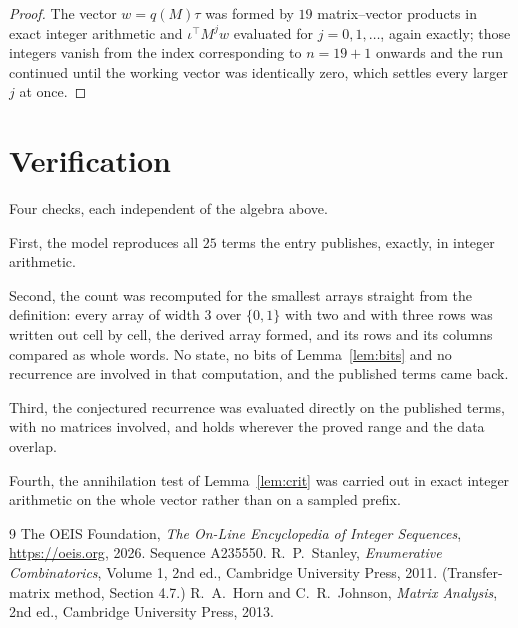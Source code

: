 \documentclass[11pt,a4paper]{article}
\theoremstyle{plain}
\theoremstyle{definition}
\begin{document}
\begin{proof}
The vector $w=q(M)\tau$ was formed by $19$ matrix--vector products in exact integer
arithmetic and $\iota^{\!\top}M^{j}w$ evaluated for $j=0,1,\dots$, again exactly; those
integers vanish from the index corresponding to $n=19+1$ onwards and the run continued
until the working vector was identically zero, which settles every larger $j$ at once.
\end{proof}

\section{Verification}

Four checks, each independent of the algebra above.

First, the model reproduces all $25$ terms the entry publishes, exactly, in integer
arithmetic.

Second, the count was recomputed for the smallest arrays straight from the definition: every
array of width $3$ over $\{0,1\}$ with two and with three rows was written out cell by cell,
the derived array formed, and its rows and its columns compared as whole words. No state, no
bits of Lemma~\ref{lem:bits} and no recurrence are involved in that computation, and the
published terms came back.

Third, the conjectured recurrence was evaluated directly on the published terms, with no
matrices involved, and holds wherever the proved range and the data overlap.

Fourth, the annihilation test of Lemma~\ref{lem:crit} was carried out in exact integer
arithmetic on the whole vector rather than on a sampled prefix.

\begin{thebibliography}{9}
 The OEIS Foundation, \emph{The On-Line Encyclopedia of Integer
Sequences}, \url{https://oeis.org}, 2026. Sequence A235550.
 R.~P.~Stanley, \emph{Enumerative Combinatorics}, Volume 1, 2nd ed.,
Cambridge University Press, 2011. (Transfer-matrix method, Section 4.7.)
 R.~A.~Horn and C.~R.~Johnson, \emph{Matrix Analysis}, 2nd ed., Cambridge
University Press, 2013.
\end{thebibliography}
\end{document}
